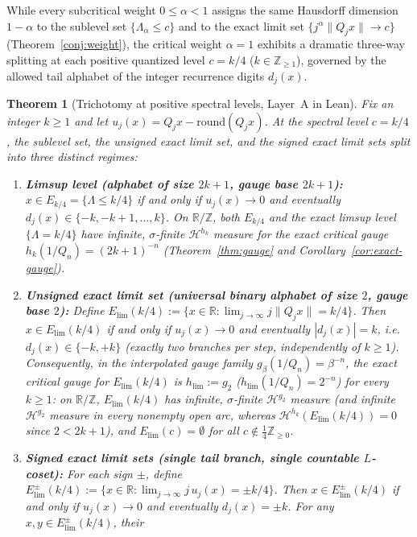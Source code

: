 \documentclass[11pt]{article}
\newtheorem{theorem}{Theorem}
\theoremstyle{definition}
\theoremstyle{remark}
\newcommand{\R}{\mathbb{R}}
\newcommand{\Z}{\mathbb{Z}}
\newcommand{\Lam}{\Lambda}
\begin{document}
While every subcritical weight $0\le\alpha<1$ assigns the same Hausdorff
dimension $1-\alpha$ to the sublevel set $\{\Lam_\alpha\le c\}$ and to the
exact limit set $\{j^\alpha\|Q_jx\|\to c\}$ (Theorem~\ref{conj:weight}), the
critical weight $\alpha=1$ exhibits a dramatic three-way splitting at each
positive quantized level $c=k/4$ ($k\in\Z_{\ge1}$), governed by the allowed
tail alphabet of the integer recurrence digits $d_j(x)$.

\begin{theorem}[Trichotomy at positive spectral levels, Layer~A in Lean]\label{thm:trichotomy}
Fix an integer $k\ge1$ and let $u_j(x)=Q_jx-\mathrm{round}(Q_jx)$. At the
spectral level $c=k/4$, the sublevel set, the unsigned exact limit set, and
the signed exact limit sets split into three distinct regimes:
\begin{enumerate}[label=(\roman*),leftmargin=2em]
\item \textbf{Limsup level (alphabet of size $2k+1$, gauge base $2k+1$):}
$x\in E_{k/4}=\{\Lam\le k/4\}$ if and only if $u_j(x)\to0$ and eventually
$d_j(x)\in\{-k,-k+1,\dots,k\}$. On $\R/\Z$, both $E_{k/4}$ and the exact
limsup level $\{\Lam=k/4\}$ have infinite, $\sigma$-finite $\mathcal H^{h_k}$
measure for the exact critical gauge $h_k(1/Q_n)=(2k+1)^{-n}$
(Theorem~\ref{thm:gauge} and Corollary~\ref{cor:exact-gauge}).
\item \textbf{Unsigned exact limit set (universal binary alphabet of size $2$, gauge base $2$):}
Define $E_{\mathrm{lim}}(k/4):=\{x\in\R:\lim_{j\to\infty}j\|Q_jx\|=k/4\}$.
Then $x\in E_{\mathrm{lim}}(k/4)$ if and only if $u_j(x)\to0$ and eventually
$|d_j(x)|=k$, i.e.\ $d_j(x)\in\{-k,+k\}$ (exactly two branches per step,
\emph{independently} of $k\ge1$). Consequently, in the interpolated gauge
family $g_\beta(1/Q_n)=\beta^{-n}$, the exact critical gauge for
$E_{\mathrm{lim}}(k/4)$ is $h_{\mathrm{lim}}:=g_2$ ($h_{\mathrm{lim}}(1/Q_n)=2^{-n}$)
for \emph{every} $k\ge1$: on $\R/\Z$, $E_{\mathrm{lim}}(k/4)$ has infinite,
$\sigma$-finite $\mathcal H^{g_2}$ measure (and infinite $\mathcal H^{g_2}$
measure in every nonempty open arc, whereas
$\mathcal H^{h_k}(E_{\mathrm{lim}}(k/4))=0$ since $2<2k+1$), and
$E_{\mathrm{lim}}(c)=\emptyset$ for all $c\notin\frac14\Z_{\ge0}$.
\item \textbf{Signed exact limit sets (single tail branch, single countable $L$-coset):}
For each sign $\pm$, define
$E_{\mathrm{lim}}^\pm(k/4):=\{x\in\R:\lim_{j\to\infty}j\,u_j(x)=\pm k/4\}$.
Then $x\in E_{\mathrm{lim}}^\pm(k/4)$ if and only if $u_j(x)\to0$ and
eventually $d_j(x)=\pm k$. For any $x,y\in E_{\mathrm{lim}}^\pm(k/4)$, their

\end{enumerate}
\end{theorem}
\end{document}
